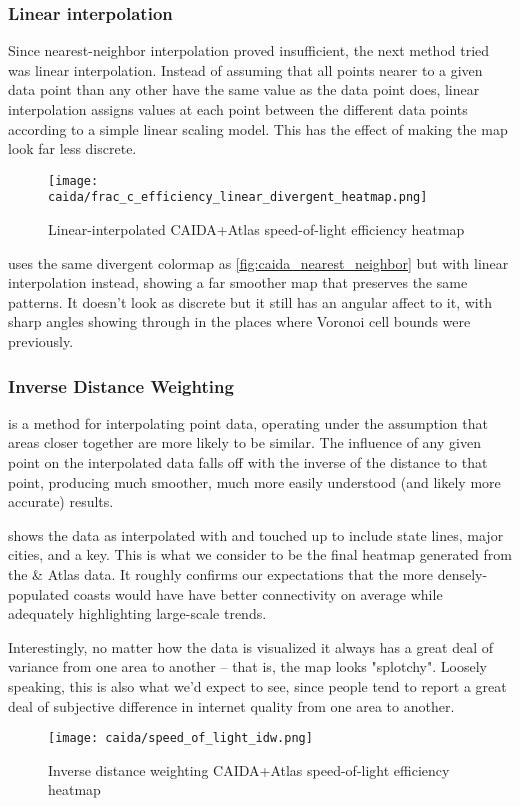 \subsubsection{Linear interpolation}

Since nearest-neighbor interpolation proved insufficient, the next method tried was linear interpolation. Instead of assuming that all points nearer to a given data point than any other have the same value as the data point does, linear interpolation assigns values at each point between the different data points according to a simple linear scaling model. This has the effect of making the map look far less discrete.

\begin{figure}[h]
    \centering
    \texttt{[image: caida/frac\_c\_efficiency\_linear\_divergent\_heatmap.png]}
    \caption{Linear-interpolated CAIDA+Atlas speed-of-light efficiency heatmap}
    \label{fig:caida_linear_interpolation}
\end{figure}

 uses the same divergent colormap as \cref{fig:caida_nearest_neighbor} but with linear interpolation instead, showing a far smoother map that preserves the same patterns. It doesn't look as discrete but it still has an angular affect to it, with sharp angles showing through in the places where Voronoi cell bounds were previously.


\subsubsection{Inverse Distance Weighting}

\IDW is a method for interpolating point data, operating under the assumption that areas closer together are more likely to be similar. The influence of any given point on the interpolated data falls off with the inverse of the distance to that point, producing much smoother, much more easily understood (and likely more accurate) results.

 shows the data as interpolated with \idw and touched up to include state lines, major cities, and a key. This is what we consider to be the final heatmap generated from the \caida \& \ripe Atlas data. It roughly confirms our expectations that the more densely-populated coasts would have have better connectivity on average while adequately highlighting large-scale trends.

Interestingly, no matter how the data is visualized it always has a great deal of variance from one area to another -- that is, the map looks "splotchy". Loosely speaking, this is also what we'd expect to see, since people tend to report a great deal of subjective difference in internet quality from one area to another.

\begin{figure}[hb]
    \centering
    \texttt{[image: caida/speed\_of\_light\_idw.png]}
    \caption{Inverse distance weighting CAIDA+Atlas speed-of-light efficiency heatmap}
    \label{fig:caida_idw_heatmap}
\end{figure}
